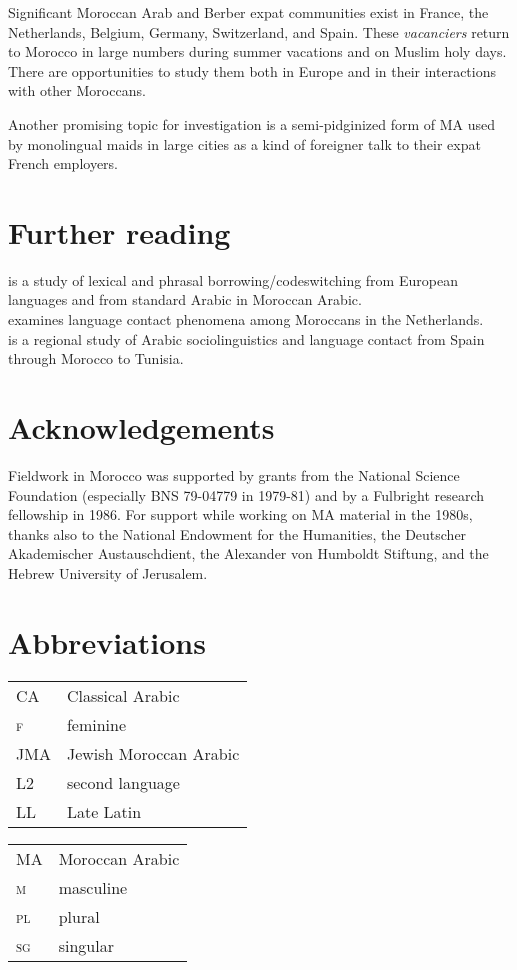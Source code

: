 \documentclass[output=paper]{langsci/langscibook}
\begin{document}
Significant Moroccan Arab and Berber expat communities exist in France, the Netherlands, Belgium, Germany, Switzerland, and Spain. These \textit{vacanciers} return to Morocco in large numbers during summer vacations and on Muslim holy days. There are opportunities to study them both in Europe \citep{Nortier1990} and in their interactions with other Moroccans. 

Another promising topic for investigation is a semi-pidginized form of MA used by monolingual maids in large cities as a kind of foreigner talk to their expat French employers.

\section*{Further reading}

\citet{Heath1989} is a study of lexical and phrasal borrowing/codeswitching from European languages and from standard Arabic in Moroccan Arabic.\\
\citet{Nortier1990} examines language contact phenomena among Moroccans in the Netherlands.\\
\citet{Sayahi2014} is a regional study of Arabic sociolinguistics and language contact from Spain through Morocco to Tunisia.

\section*{Acknowledgements}

Fieldwork in Morocco was supported by grants from the National Science Foundation (especially BNS 79-04779 in 1979-81) and by a Fulbright research fellowship in 1986. For support while working on MA material in the 1980s, thanks also to the National Endowment for the Humanities, the Deutscher Akademischer Austauschdient, the Alexander von Humboldt Stiftung, and the Hebrew University of Jerusalem.

\section*{Abbreviations}
\begin{tabularx}{.5\textwidth}{@{}lQ@{}}
CA          & Classical Arabic\\
\textsc{f}  & feminine\\
JMA         & Jewish Moroccan Arabic\\
L2          & second language \\
LL          & Late Latin\\
\end{tabularx}%
\begin{tabularx}{.5\textwidth}{@{}lQ@{}}
MA          & Moroccan Arabic\\
\textsc{m}  & masculine\\
\textsc{pl} & plural\\
\textsc{sg} & singular
\end{tabularx}%


 
{\sloppy\printbibliography[heading=subbibliography,notkeyword=this]}
\end{document}
